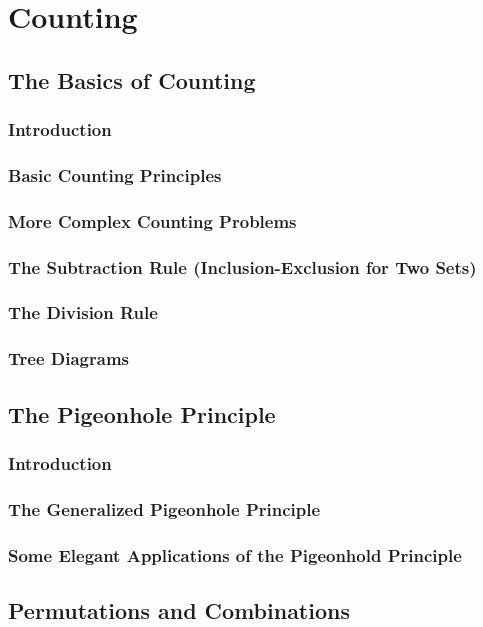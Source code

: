 \documentclass[11pt]{book}
\begin{document}
\chapter{Counting}
 \section{The Basics of Counting}
  \subsection{Introduction}
  \subsection{Basic Counting Principles}
  \subsection{More Complex Counting Problems}
  \subsection{The Subtraction Rule (Inclusion-Exclusion for Two Sets)}
  \subsection{The Division Rule}
  \subsection{Tree Diagrams}
  
 \section{The Pigeonhole Principle}
  \subsection{Introduction}
  \subsection{The Generalized Pigeonhole Principle}
  \subsection{Some Elegant Applications of the Pigeonhold Principle}
 
 \section{Permutations and Combinations}
\end{document}
